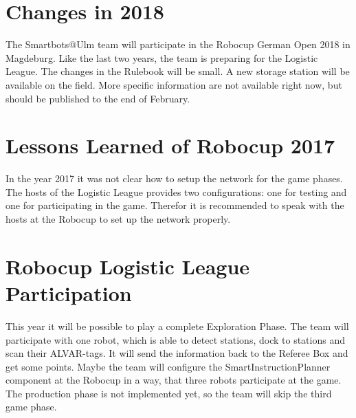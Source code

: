 \section{Changes in 2018}

The Smartbots@Ulm team will participate in the Robocup German Open 2018 in Magdeburg. Like the last two years, the team is preparing for the Logistic League. The changes in the Rulebook will be small. A new storage station will be available on the field. More specific information are not available right now, but should be published to the end of February.


\section{Lessons Learned of Robocup 2017}

In the year 2017 it was not clear how to setup the network for the game phases. The hosts of the Logistic League provides two configurations: one for testing and one for participating in the game. Therefor it is recommended to speak with the hosts at the Robocup to set up the network properly. 


\section{Robocup Logistic League Participation}

This year it will be possible to play a complete Exploration Phase. The team will participate with one robot, which is able to detect stations, dock to stations and scan their ALVAR-tags. It will send the information back to the Referee Box and get some points. Maybe the team will configure the SmartInstructionPlanner component at the Robocup in a way, that three robots  participate at the game.
The production phase is not implemented yet, so the team will skip the third game phase.
